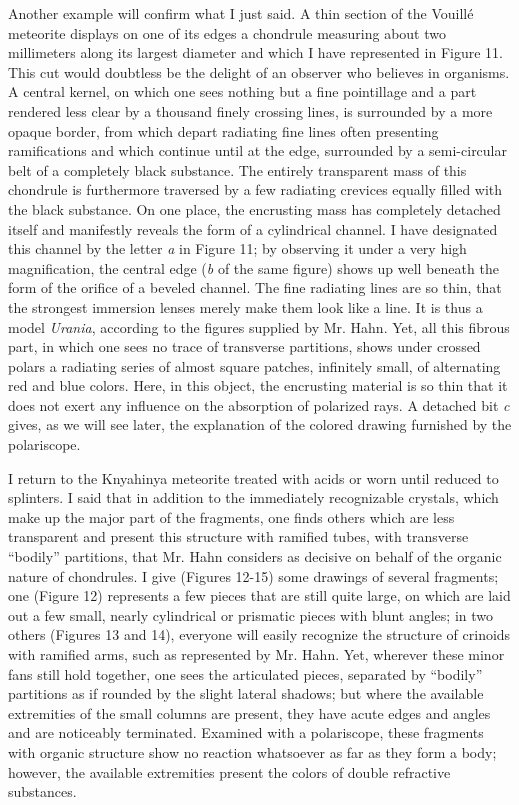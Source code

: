 \documentclass[a4paper, 12pt, oneside]{article}
\begin{document}
Another example will confirm what I just said. A thin section of the Vouillé meteorite displays on one of its edges a chondrule measuring about two millimeters along its largest diameter and which I have represented in Figure 11. This cut would doubtless be the delight of an observer who believes in organisms. A central kernel, on which one sees nothing but a fine pointillage and a part rendered less clear by a thousand finely crossing lines, is surrounded by a more opaque border, from which depart radiating fine lines often presenting ramifications and which continue until at the edge, surrounded by a semi-circular belt of a completely black substance. The entirely transparent mass of this chondrule is furthermore traversed by a few radiating crevices equally filled with the black substance. On one place, the encrusting mass has completely detached itself and manifestly reveals the form of a cylindrical channel. I have designated this channel by the letter \emph{a} in Figure 11; by observing it under a very high magnification, the central edge (\emph{b} of the same figure) shows up well beneath the form of the orifice of a beveled channel. The fine radiating lines are so thin, that the strongest immersion lenses merely make them look like a line. It is thus a model \emph{Urania}, according to the figures supplied by Mr. Hahn. Yet, all this fibrous part, in which one sees no trace of transverse partitions, shows under crossed polars a radiating series of almost square patches, infinitely small, of alternating red and blue colors. Here, in this object, the encrusting material is so thin that it does not exert any influence on the absorption of polarized rays. A detached bit \emph{c} gives, as we will see later, the explanation of the colored drawing furnished by the polariscope.

I return to the Knyahinya meteorite treated with acids or worn until reduced to splinters. I said that in addition to the immediately recognizable crystals, which make up the major part of the fragments, one finds others which are less transparent and present this structure with ramified tubes, with transverse ``bodily'' partitions, that Mr. Hahn considers as decisive on behalf of the organic nature of chondrules. I give (Figures 12-15) some drawings of several fragments; one (Figure 12) represents a few pieces that are still quite large, on which are laid out a few small, nearly cylindrical or prismatic pieces with blunt angles; in two others (Figures 13 and 14), everyone will easily recognize the structure of crinoids with ramified arms, such as represented by Mr. Hahn. Yet, wherever these minor fans still hold together, one sees the articulated pieces, separated by ``bodily'' partitions as if rounded by the slight lateral shadows; but where the available extremities of the small columns are present, they have acute edges and angles and are noticeably terminated. Examined with a polariscope, these fragments with organic structure show no reaction whatsoever as far as they form a body; however, the available extremities present the colors of double refractive substances.
\end{document}
